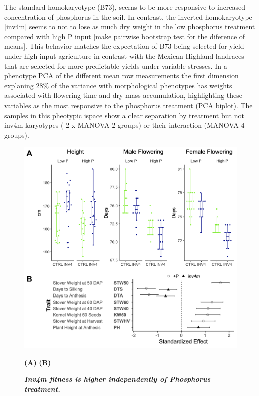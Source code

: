 The standard homokaryotype (B73), seems to be more responsive to increased concentration of phosphorus in the soil. In contrast, the  inverted homokaryotype [inv4m] seems to not to lose as much dry weight in the low phosphorus treatment compared with high P input [make pairwise bootstrap test for the diference of means]. 
This behavior matches the expectation of B73 being selected for yield under high input agriculture in contrast with the Mexican Highland landraces that are selected for more predictable yields under variable stresses. In a phenotype PCA of the different mean row measurements the first dimension explaning 28\% of the variance with morphological phenotypes has weights associated with flowering time and dry mass accumulation, highlighting these variables as the most responsive to the phosphorus treatment (PCA biplot). 
The samples in this pheotypic ispace show a clear separation by treatment  but not  inv4m karyotypes ( 2 x MANOVA 2 groups) or their interaction (MANOVA 4 groups).


\begin{figure}[!ht]
\centering
\includegraphics[width=\linewidth]{Chapter-3/figs/effects.png}
\caption[Inv4m fitness is higher independently of phosphorus treatment]{\textit{\textbf{Inv4m fitness is higher independently of Phosphorus treatment.}}}
\textbf{(A)} 
\textbf{(B)}
\label{fig::effects}
\end{figure}


